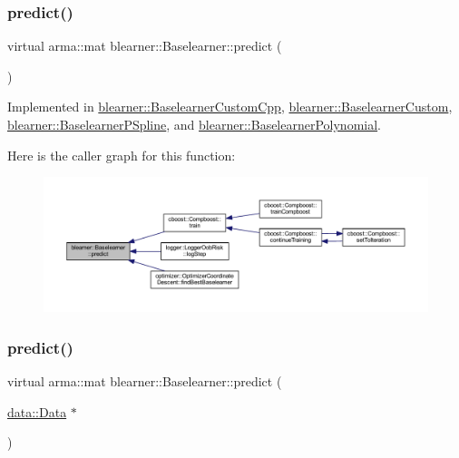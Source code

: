 \subsubsection{\texorpdfstring{predict()}{predict()}\hspace{0.1cm}{\footnotesize\ttfamily [1/2]}}
{\footnotesize\ttfamily virtual arma\+::mat blearner\+::\+Baselearner\+::predict (\begin{DoxyParamCaption}{ }\end{DoxyParamCaption})\hspace{0.3cm}{\ttfamily [pure virtual]}}



Implemented in \mbox{\hyperlink{classblearner_1_1_baselearner_custom_cpp_a88c17ed1e32255e482f34695e06e7d25}{blearner\+::\+Baselearner\+Custom\+Cpp}}, \mbox{\hyperlink{classblearner_1_1_baselearner_custom_a7d9640dbb9a118b77735cf79a5850652}{blearner\+::\+Baselearner\+Custom}}, \mbox{\hyperlink{classblearner_1_1_baselearner_p_spline_a7d170166132a69ad0fb046e4599e0336}{blearner\+::\+Baselearner\+P\+Spline}}, and \mbox{\hyperlink{classblearner_1_1_baselearner_polynomial_ad45b97c416ac06755c617b671cfbdb76}{blearner\+::\+Baselearner\+Polynomial}}.

Here is the caller graph for this function\+:
\nopagebreak
\begin{figure}[H]
\begin{center}
\leavevmode
\includegraphics[width=350pt]{classblearner_1_1_baselearner_ab37986047db43c84420fef2cef7fc20d_icgraph}
\end{center}
\end{figure}
\mbox{\label{classblearner_1_1_baselearner_ae2ef5e018783578e02b3b5a33fa94eae}} 
\subsubsection{\texorpdfstring{predict()}{predict()}\hspace{0.1cm}{\footnotesize\ttfamily [2/2]}}
{\footnotesize\ttfamily virtual arma\+::mat blearner\+::\+Baselearner\+::predict (\begin{DoxyParamCaption}\item[{\mbox{\hyperlink{classdata_1_1_data}{data\+::\+Data}} $\ast$}]{ }\end{DoxyParamCaption})\hspace{0.3cm}{\ttfamily [pure virtual]}}



